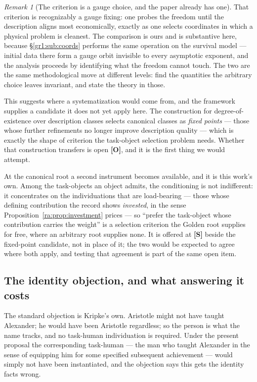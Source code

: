 \documentclass[11pt]{article}
\numberwithin{equation}{section}
\theoremstyle{plain}
\theoremstyle{definition}
\theoremstyle{remark}
\newtheorem{remark}[theorem]{Remark}
\begin{document}
\begin{remark}[The criterion is a gauge choice, and the paper already
has one]\label{to:rem:gauge}
That criterion is recognizably a gauge fixing: one probes the freedom
until the description aligns most economically, exactly as one selects
coordinates in which a physical problem is cleanest. The comparison is
ours and is substantive here, because
\S\ref{gr1:sub:coords} performs the same operation on the survival
model --- initial data there form a gauge orbit invisible to every
asymptotic exponent, and the analysis proceeds by identifying what the
freedom cannot touch. The two are the same methodological move at
different levels: find the quantities the arbitrary choice leaves
invariant, and state the theory in those.

This suggests where a systematization would come from, and the framework
supplies a candidate it does not yet apply here. The construction for
degree-of-existence over description classes \cite{Aethus} selects
canonical classes as \emph{fixed points} --- those whose further
refinements no longer improve description quality --- which is exactly
the shape of criterion the task-object selection problem needs. Whether
that construction transfers is open \textbf{[O]}, and it is the first
thing we would attempt.

At the canonical root a second instrument becomes available, and it is
this work's own. Among the task-objects an object admits, the
conditioning is not indifferent: it concentrates on the individuations
that are load-bearing --- those whose defining contribution the record
shows \emph{invested}, in the sense
Proposition~\ref{ra:prop:investment} prices --- so ``prefer the
task-object whose contribution carries the weight'' is a selection
criterion the Golden root supplies for free, where an arbitrary root
supplies none. It is offered at \textbf{[S]} beside the fixed-point
candidate, not in place of it; the two would be expected to agree
where both apply, and testing that agreement is part of the same open
item.
\end{remark}

\subsection{The identity objection, and what answering it costs}
\label{to:sub:identity}

The standard objection is Kripke's own. Aristotle might not have taught
Alexander; he would have been Aristotle regardless; so the person is
what the name tracks, and no task-human individuation is required.
Under the present proposal the corresponding task-human --- the man who
taught Alexander in the sense of equipping him for some specified
subsequent achievement --- would simply not have been instantiated, and
the objection says this gets the identity facts wrong.
\end{document}
